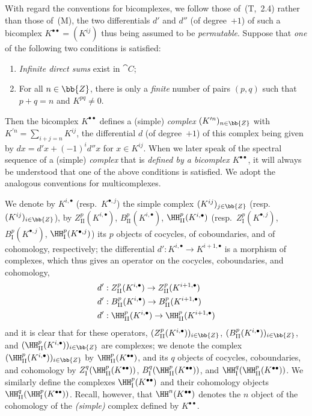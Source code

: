 \begin{env}[11.3.1]
\label{0.11.3.1}
With regard the conventions for bicomplexes, we follow those of~(T,~2.4) rather than those of~(M), the two differentials $d'$ and $d''$ (of degree~$+1$) of such a bicomplex $K^{\bullet\bullet}=(K^{ij})$ thus being assumed to be \emph{permutable}.
Suppose that \emph{one} of the following two conditions is satisfied:
\begin{enumerate}
   \item \emph{Infinite direct sums} exist in $\cat{C}$;
   \item For all $n\in\bb{Z}$, there is only a \emph{finite} number of pairs $(p,q)$ such that $p+q=n$ and $K^{pq}\neq 0$.
 \end{enumerate}
Then the bicomplex $K^{\bullet\bullet}$ defines a (simple) \emph{complex} $(K^{\prime n})_{n\in\bb{Z}}$ with $K^{\prime n}=\sum_{i+j=n}K^{ij}$, the differential $d$ (of degree~$+1$) of this complex being given by $dx=d'x+(-1)^i d''x$ for $x\in K^{ij}$.
When we later speak of the spectral sequence of a (simple) \emph{complex} that is \emph{defined by a bicomplex $K^{\bullet\bullet}$}, it will always be understood that one of the above conditions is satisfied.
We adopt the analogous conventions for multicomplexes.

We denote by $K^{i,\bullet}$ (resp.~$K^{\bullet,j}$) the simple complex $(K^{ij})_{j\in\bb{Z}}$ (resp.~$(K^{ij})_{i\in\bb{Z}}$), by $Z_\mathrm{II}^p(K^{i,\bullet})$, $B_\mathrm{II}^p(K^{i,\bullet})$, $\HH_\mathrm{II}^p(K^{i,\bullet})$ (resp.~$Z_\mathrm{I}^p(K^{\bullet,j})$, $B_\mathrm{I}^p(K^{\bullet,j})$, $\HH_\mathrm{I}^p(K^{\bullet,j})$) its $p$ objects of cocycles, of coboundaries, and of cohomology, respectively;
the differential $d':K^{i,\bullet}\to K^{i+1,\bullet}$ is a morphism of complexes, which thus gives an operator on the cocycles, coboundaries, and cohomology,
\begin{align*}
  d'&:Z_\mathrm{II}^p(K^{i,\bullet})\to Z_\mathrm{II}^p(K^{i+1,\bullet})
\\d'&:B_\mathrm{II}^p(K^{i,\bullet})\to B_\mathrm{II}^p(K^{i+1,\bullet})
\\d'&:\HH_\mathrm{II}^p(K^{i,\bullet})\to\HH_\mathrm{II}^p(K^{i+1,\bullet})
\end{align*}
and it is clear that for these operators, $(Z_\mathrm{II}^p(K^{i,\bullet}))_{i\in\bb{Z}}$, $(B_\mathrm{II}^p(K^{i,\bullet}))_{i\in\bb{Z}}$, and $(\HH_\mathrm{II}^p(K^{i,\bullet}))_{i\in\bb{Z}}$ are complexes;
we denote the complex $(\HH_\mathrm{II}^p(K^{i,\bullet}))_{i\in\bb{Z}}$ by $\HH_\mathrm{II}^p(K^{\bullet\bullet})$, and its $q$ objects of cocycles, coboundaries, and cohomology by $Z_\mathrm{I}^q(\HH_\mathrm{II}^p(K^{\bullet\bullet}))$, $B_\mathrm{I}^q(\HH_\mathrm{II}^p(K^{\bullet\bullet}))$, and $\HH_\mathrm{I}^q(\HH_\mathrm{II}^p(K^{\bullet\bullet}))$.
We similarly define the complexes $\HH_\mathrm{I}^p(K^{\bullet\bullet})$ and their cohomology objects $\HH_\mathrm{II}^q(\HH_\mathrm{I}^p(K^{\bullet\bullet}))$.
Recall, however, that $\HH^n(K^{\bullet\bullet})$ denotes the $n$ object of the cohomology of the \emph{(simple)} complex defined by $K^{\bullet\bullet}$.
\end{env}

